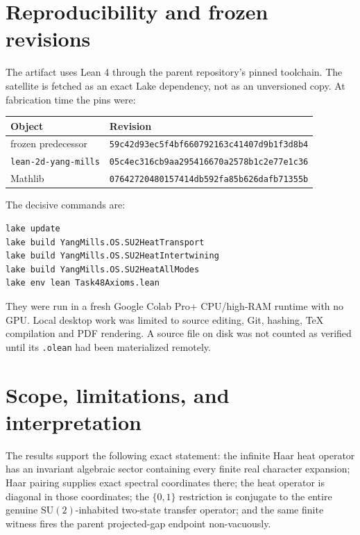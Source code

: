 \documentclass[11pt]{article}
\theoremstyle{definition}
\theoremstyle{remark}
\newcommand{\SU}{\mathrm{SU}(2)}
\begin{document}
\section{Reproducibility and frozen revisions}

The artifact uses Lean 4 through the parent repository's pinned toolchain.
The satellite is fetched as an exact Lake dependency, not as an unversioned
copy.  At fabrication time the pins were:
\begin{center}
\begin{tabular}{ll}
\toprule
Object & Revision \\
\midrule
frozen predecessor & \texttt{59c42d93ec5f4bf660792163c41407d9b1f3d8b4} \\
\texttt{lean-2d-yang-mills} & \texttt{05c4ec316cb9aa295416670a2578b1c2e77e1c36} \\
Mathlib & \texttt{07642720480157414db592fa85b626dafb71355b} \\
\bottomrule
\end{tabular}
\end{center}

The decisive commands are:
\begin{lstlisting}[language={}]
lake update
lake build YangMills.OS.SU2HeatTransport
lake build YangMills.OS.SU2HeatIntertwining
lake build YangMills.OS.SU2HeatAllModes
lake env lean Task48Axioms.lean
\end{lstlisting}
They were run in a fresh Google Colab Pro+ CPU/high-RAM runtime with no GPU.
Local desktop work was limited to source editing, Git, hashing, TeX compilation
and PDF rendering.  A source file on disk was not counted as verified until its
\texttt{.olean} had been materialized remotely.

\section{Scope, limitations, and interpretation}

The results support the following exact statement: the infinite Haar heat
operator has an invariant algebraic sector containing every finite real
character expansion; Haar pairing supplies exact spectral coordinates there;
the heat operator is diagonal in those coordinates; the $\{0,1\}$ restriction
is conjugate to the entire genuine $\SU$-inhabited two-state transfer operator;
and the same finite witness fires the parent projected-gap endpoint
non-vacuously.
\end{document}
